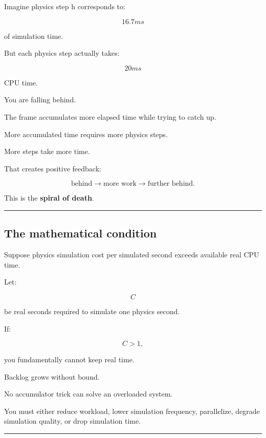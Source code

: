 \hypertarget{06-engine-ii-ch037-part-1676-spiral-of-death}{}

Imagine physics step h corresponds to:

\[
16.7ms
\]

of simulation time.

But each physics step actually takes:

\[
20ms
\]

CPU time.

You are falling behind.

The frame accumulates more elapsed time while trying to catch up.

More accumulated time requires more physics steps.

More steps take more time.

That creates positive feedback:

\[
\boxed{
\text{behind}
\rightarrow
\text{more work}
\rightarrow
\text{further behind}.
}
\]

This is the \textbf{spiral of death}.

\begin{center}\rule{0.5\linewidth}{0.5pt}\end{center}

\subsection{The mathematical condition}\label{06-engine-ii-ch037-the-mathematical-condition}

\hypertarget{06-engine-ii-ch037-the-mathematical-condition}{}

Suppose physics simulation cost per simulated second exceeds available real CPU time.

Let:

\[
C
\]

be real seconds required to simulate one physics second.

If:

\[
C>1,
\]

you fundamentally cannot keep real time.

Backlog grows without bound.

No accumulator trick can solve an overloaded system.

You must either reduce workload, lower simulation frequency, parallelize, degrade simulation quality, or drop simulation time.

\begin{center}\rule{0.5\linewidth}{0.5pt}\end{center}

